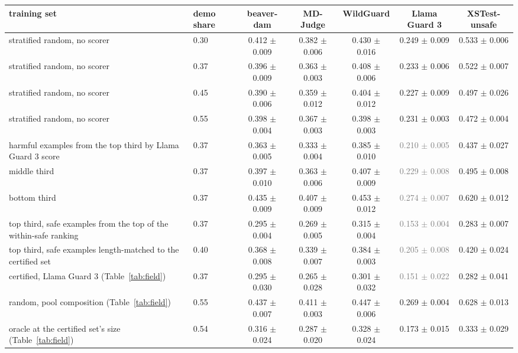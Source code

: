 \begin{tabular}{llccccc}
\toprule
training set & demo share & beaver-dam & MD-Judge & WildGuard & Llama Guard 3 & XSTest-unsafe \\
\midrule
stratified random, no scorer & 0.30 & 0.412 $\pm$ 0.009 & 0.382 $\pm$ 0.006 & 0.430 $\pm$ 0.016 & 0.249 $\pm$ 0.009 & 0.533 $\pm$ 0.006 \\
stratified random, no scorer & 0.37 & 0.396 $\pm$ 0.009 & 0.363 $\pm$ 0.003 & 0.408 $\pm$ 0.006 & 0.233 $\pm$ 0.006 & 0.522 $\pm$ 0.007 \\
stratified random, no scorer & 0.45 & 0.390 $\pm$ 0.006 & 0.359 $\pm$ 0.012 & 0.404 $\pm$ 0.012 & 0.227 $\pm$ 0.009 & 0.497 $\pm$ 0.026 \\
stratified random, no scorer & 0.55 & 0.398 $\pm$ 0.004 & 0.367 $\pm$ 0.003 & 0.398 $\pm$ 0.003 & 0.231 $\pm$ 0.003 & 0.472 $\pm$ 0.004 \\
\midrule
harmful examples from the top third by Llama Guard 3 score & 0.37 & 0.363 $\pm$ 0.005 & 0.333 $\pm$ 0.004 & 0.385 $\pm$ 0.010 & \textcolor{gray}{0.210 $\pm$ 0.005} & 0.437 $\pm$ 0.027 \\
middle third & 0.37 & 0.397 $\pm$ 0.010 & 0.363 $\pm$ 0.006 & 0.407 $\pm$ 0.009 & \textcolor{gray}{0.229 $\pm$ 0.008} & 0.495 $\pm$ 0.008 \\
bottom third & 0.37 & 0.435 $\pm$ 0.009 & 0.407 $\pm$ 0.009 & 0.453 $\pm$ 0.012 & \textcolor{gray}{0.274 $\pm$ 0.007} & 0.620 $\pm$ 0.012 \\
\midrule
top third, safe examples from the top of the within-safe ranking & 0.37 & 0.295 $\pm$ 0.004 & 0.269 $\pm$ 0.005 & 0.315 $\pm$ 0.004 & \textcolor{gray}{0.153 $\pm$ 0.004} & 0.283 $\pm$ 0.007 \\
top third, safe examples length-matched to the certified set & 0.40 & 0.368 $\pm$ 0.008 & 0.339 $\pm$ 0.007 & 0.384 $\pm$ 0.003 & \textcolor{gray}{0.205 $\pm$ 0.008} & 0.420 $\pm$ 0.024 \\
\midrule
certified, Llama Guard 3 (Table~\ref{tab:field}) & 0.37 & 0.295 $\pm$ 0.030 & 0.265 $\pm$ 0.028 & 0.301 $\pm$ 0.032 & \textcolor{gray}{0.151 $\pm$ 0.022} & 0.282 $\pm$ 0.041 \\
random, pool composition (Table~\ref{tab:field}) & 0.55 & 0.437 $\pm$ 0.007 & 0.411 $\pm$ 0.003 & 0.447 $\pm$ 0.006 & 0.269 $\pm$ 0.004 & 0.628 $\pm$ 0.013 \\
oracle at the certified set's size (Table~\ref{tab:field}) & 0.54 & 0.316 $\pm$ 0.024 & 0.287 $\pm$ 0.020 & 0.328 $\pm$ 0.024 & 0.173 $\pm$ 0.015 & 0.333 $\pm$ 0.029 \\
\bottomrule
\end{tabular}
